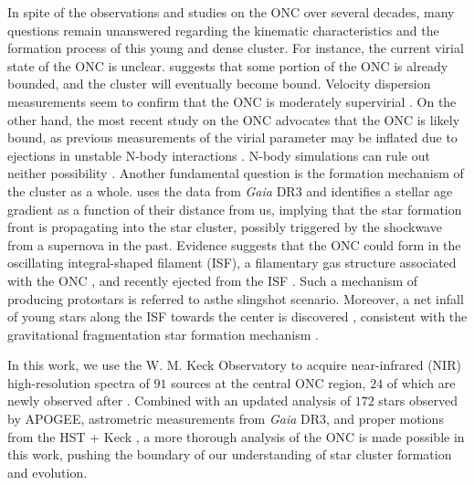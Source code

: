 \documentclass[12pt]{ucsddissertation}
\begin{document}
\begin{CJK*}{UTF8}{gbsn}
In spite of the observations and studies on the ONC over several decades, many questions remain unanswered regarding the kinematic characteristics and the formation process of this young and dense cluster. For instance, the current virial state of the ONC is unclear. \citet{Hillenbrand-1998} suggests that some portion of the ONC is already bounded, and the cluster will eventually become bound. Velocity dispersion measurements seem to confirm that the ONC is moderately supervirial \citep[e.g.,][]{DaRio-2014, DaRio-2017, Kim-2019, Theissen-2022}. On the other hand, the most recent study on the ONC advocates that the ONC is likely bound, as previous measurements of the virial parameter may be inflated due to ejections in unstable N-body interactions \cite{Kounkel-2022}. N-body simulations can rule out neither possibility \citep[][]{Kroupa-2000, Scally-2005}. Another fundamental question is the formation mechanism of the cluster as a whole. \citet{Kounkel-2022} uses the data from \textit{Gaia} DR3 and identifies a stellar age gradient as a function of their distance from us, implying that the star formation front is propagating into the star cluster, possibly triggered by the shockwave from a supernova in the past. Evidence suggests that the ONC could form in the oscillating integral-shaped filament (ISF), a filamentary gas structure associated with the ONC \citep{Bally-1987}, and recently ejected from the ISF \citep{Stutz-2016, Stutz-2018, Matus-2023}. Such a mechanism of producing protostars is referred to asthe  slingshot scenario.  Moreover, a net infall of young stars along the ISF towards the center is discovered \citep[][]{Kounkel-2022}, consistent with the gravitational fragmentation star formation mechanism \citep[][]{Bonnell-2008}.

In this work, we use the W. M. Keck Observatory to acquire near-infrared (NIR) high-resolution spectra of $91$ sources at the central ONC region, $24$ of which are newly observed after . Combined with an updated analysis of $172$ stars observed by APOGEE, astrometric measurements from \textit{Gaia} DR3, and proper motions from the HST + Keck , a more thorough analysis of the ONC is made possible in this work, pushing the boundary of our understanding of star cluster formation and evolution. 


\end{CJK*}
\end{document}
